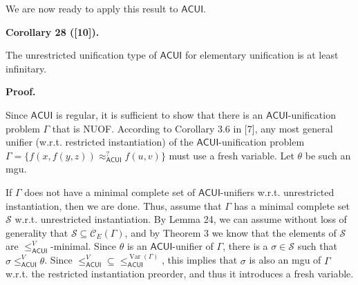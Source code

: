 \documentclass[10pt,a4paper]{amsart}
\begin{document}
 
 
 
We are now ready to apply this result to $\mathsf{ACUI}$.\par
 
 
 
\par\medskip\noindent\textbf{Corollary 28 ([10]).}\par
 
 
The unrestricted unification type of $\mathsf{ACUI}$ for elementary unification is at least infinitary.\par
 
 
 
 
 
\par\medskip\noindent\textbf{Proof.}\par
 
 
Since $\mathsf{ACUI}$ is regular, it is sufficient to show that there is an $\mathsf{ACUI}$-unification problem $\Gamma$ that is NUOF. According to Corollary 3.6 in [7], any most general unifier (w.r.t. restricted instantiation) of the $\mathsf{ACUI}$-unification problem $\Gamma=\{f(x,f(y,z))\approx_{\mathsf{ACUI}}^{?}f(u,v)\}$ must use a fresh variable. Let $\theta$ be such an mgu.\par
 
 
 
If $\Gamma$ does not have a minimal complete set of $\mathsf{ACUI}$-unifiers w.r.t. unrestricted instantiation, then we are done. Thus, assume that $\Gamma$ has a minimal complete set $\mathcal{S}$ w.r.t. unrestricted instantiation. By Lemma 24, we can assume without loss of generality that $\mathcal{S}\subseteq\mathcal{C}_{E}(\Gamma)$, and by Theorem 3 we know that the elements of $\mathcal{S}$ are $\leq_{\mathsf{ACUI}}^{V}$-minimal. Since $\theta$ is an $\mathsf{ACUI}$-unifier of $\Gamma$, there is a $\sigma\in\mathcal{S}$ such that $\sigma\leq_{\mathsf{ACUI}}^{V}\theta$. Since ${\leq_{\mathsf{ACUI}}^{V}}\subseteq{\leq_{\mathsf{ACUI}}^{\operatorname{Var}(%
\Gamma)}}$, this implies that $\sigma$ is also an mgu of $\Gamma$ w.r.t. the restricted instantiation preorder, and thus it introduces a fresh variable.\par
 
\end{document}
